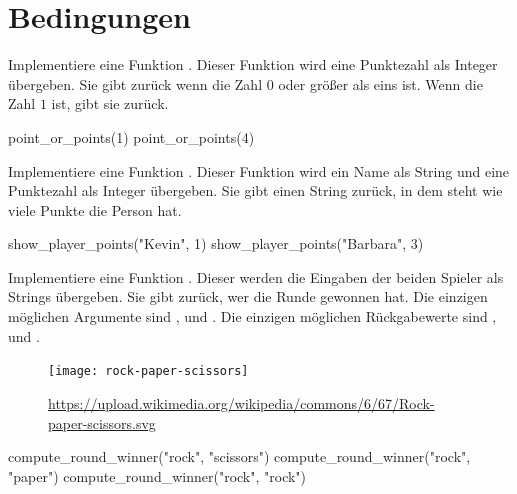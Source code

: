 \documentclass[a4paper, DIV = calc]{scrartcl}
\begin{document}
\section{Bedingungen}


\begin{aufgabe} \noindent 
Implementiere eine Funktion . Dieser Funktion wird eine Punktezahl als Integer übergeben. Sie gibt  zurück wenn die Zahl $0$ oder größer als eins ist.  Wenn die Zahl $1$ ist, gibt sie  zurück.
\begin{pyconsole}
point_or_points(1)
point_or_points(4)
\end{pyconsole}
\end{aufgabe}

\begin{aufgabe} \noindent 
Implementiere eine Funktion . Dieser Funktion wird ein Name als String und eine Punktezahl als Integer übergeben. Sie gibt einen String zurück, in dem steht wie viele Punkte die Person hat.
\begin{pyconsole}
show_player_points("Kevin", 1)
show_player_points("Barbara", 3)
\end{pyconsole}
\end{aufgabe}

\begin{aufgabe} \noindent
Implementiere eine Funktion . Dieser werden die Eingaben der beiden Spieler als Strings übergeben. Sie gibt zurück, wer die Runde gewonnen hat. Die einzigen möglichen Argumente sind ,  und . Die einzigen möglichen Rückgabewerte sind ,  und .

\begin{figure}[H]
	\centering	
	\texttt{[image: rock-paper-scissors]}
	\tiny \caption{\tiny \url{https://upload.wikimedia.org/wikipedia/commons/6/67/Rock-paper-scissors.svg}}
\end{figure}

\begin{pyconsole}
compute_round_winner("rock", "scissors")
compute_round_winner("rock", "paper")
compute_round_winner("rock", "rock")
\end{pyconsole}



\end{aufgabe}
\end{document}

